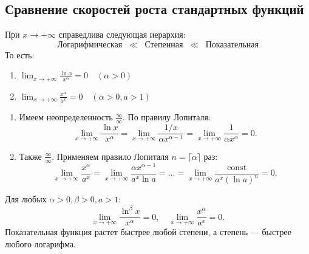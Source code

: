 \subsection{Сравнение скоростей роста стандартных функций}

\begin{theorem}
    При \(x \to +\infty\) справедлива следующая иерархия:
    \[
    \text{Логарифмическая} \;\; \ll \;\; \text{Степенная} \;\; \ll \;\; \text{Показательная}
    \]
    То есть:
    \begin{enumerate}
        \item \(\displaystyle \lim_{x \to +\infty} \frac{\ln x}{x^\alpha} = 0 \quad (\alpha > 0)\)
        \item \(\displaystyle \lim_{x \to +\infty} \frac{x^\alpha}{a^x} = 0 \quad (\alpha > 0, a > 1)\)
    \end{enumerate}
\end{theorem}

\begin{Proof}
    \begin{enumerate}
        \item Имеем неопределенность \(\frac{\infty}{\infty}\). По правилу Лопиталя:
        \[
        \lim_{x \to +\infty} \frac{\ln x}{x^\alpha} = \lim_{x \to +\infty} \frac{1/x}{\alpha x^{\alpha-1}} = \lim_{x \to +\infty} \frac{1}{\alpha x^\alpha} = 0.
        \]
        \item Также \(\frac{\infty}{\infty}\). Применяем правило Лопиталя \(n = \lceil \alpha \rceil\) раз:
        \[
        \lim_{x \to +\infty} \frac{x^\alpha}{a^x} = \lim_{x \to +\infty} \frac{\alpha x^{\alpha-1}}{a^x \ln a} = \ldots = \lim_{x \to +\infty} \frac{\text{const}}{a^x (\ln a)^n} = 0.
        \]
    \end{enumerate}
\end{Proof}

\begin{consequence}
    Для любых \(\alpha > 0, \beta > 0, a > 1\):
    \[
    \lim_{x \to +\infty} \frac{\ln^\beta x}{x^\alpha} = 0, \quad
    \lim_{x \to +\infty} \frac{x^\alpha}{a^x} = 0.
    \]
    Показательная функция растет быстрее любой степени, а степень — быстрее любого логарифма.
\end{consequence}
